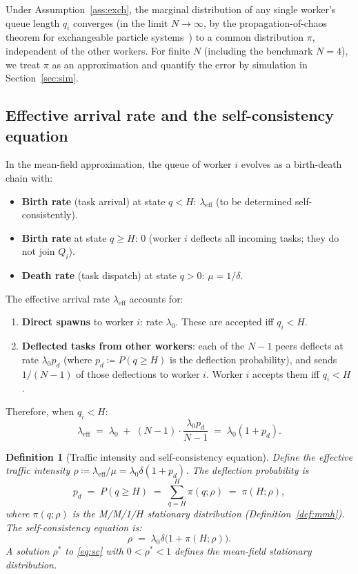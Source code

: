 \documentclass[11pt,a4paper]{report}
\newtheorem{definition}{Definition}[section]
\begin{document}
Under Assumption~\ref{ass:exch}, the marginal distribution of any
single worker's queue length $q_i$ converges (in the limit $N \to
\infty$, by the propagation-of-chaos theorem for exchangeable
particle systems~\cite{sznitman1991}) to a common distribution
$\pi$, independent of the other workers.  For finite $N$ (including
the benchmark $N=4$), we treat $\pi$ as an approximation and
quantify the error by simulation in Section~\ref{sec:sim}.

\subsection{Effective arrival rate and the self-consistency equation}

In the mean-field approximation, the queue of worker $i$ evolves
as a birth-death chain with:
\begin{itemize}
  \item \textbf{Birth rate} (task arrival) at state $q < H$:
        $\lambda_{\text{eff}}$ (to be determined self-consistently).
  \item \textbf{Birth rate} at state $q \geq H$: $0$
        (worker $i$ deflects all incoming tasks; they do not join
        $Q_i$).
  \item \textbf{Death rate} (task dispatch) at state $q > 0$:
        $\mu = 1/\delta$.
\end{itemize}

The effective arrival rate $\lambda_{\text{eff}}$ accounts for:
\begin{enumerate}
  \item \textbf{Direct spawns} to worker $i$: rate $\lambda_0$.
        These are accepted iff $q_i < H$.
  \item \textbf{Deflected tasks from other workers}: each of the
        $N-1$ peers deflects at rate $\lambda_0 p_d$ (where
        $p_d \coloneqq P(q \geq H)$ is the deflection
        probability), and sends $1/(N-1)$ of those deflections
        to worker $i$.  Worker $i$ accepts them iff $q_i < H$.
\end{enumerate}
Therefore, when $q_i < H$:
\[
  \lambda_{\text{eff}}
  \;=\; \lambda_0 \;+\; (N-1)\cdot\frac{\lambda_0 p_d}{N-1}
  \;=\; \lambda_0(1 + p_d).
\]

\begin{definition}[Traffic intensity and self-consistency equation]
\label{def:rho}
Define the \emph{effective traffic intensity}
$\rho \coloneqq \lambda_{\text{eff}} / \mu = \lambda_0 \delta (1 + p_d)$.
The deflection probability is
\[
  p_d \;=\; P(q \geq H) \;=\; \sum_{q=H}^{H} \pi(q; \rho)
  \;=\; \pi(H; \rho),
\]
where $\pi(q; \rho)$ is the M/M/1/$H$ stationary distribution
(Definition~\ref{def:mmh}).  The \emph{self-consistency equation} is:
\[
  \rho \;=\; \lambda_0\delta\bigl(1 + \pi(H;\rho)\bigr).
  \tag{SC}
  \label{eq:sc}
\]
A solution $\rho^*$ to \eqref{eq:sc} with $0 < \rho^* < 1$
defines the mean-field stationary distribution.
\end{definition}
\end{document}
